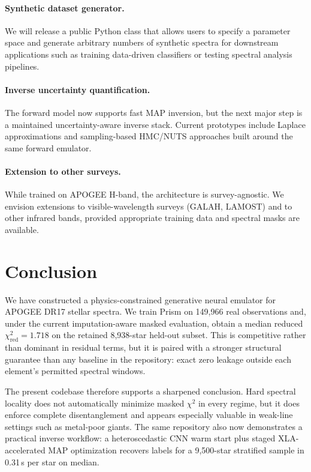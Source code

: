 \documentclass[preprint]{aastex701-1/aastex701}
\begin{document}
\paragraph{Synthetic dataset generator.}
We will release a public Python class that allows users to specify a parameter space and
generate arbitrary numbers of synthetic spectra for downstream applications such as
training data-driven classifiers or testing spectral analysis pipelines.

\paragraph{Inverse uncertainty quantification.}
The forward model now supports fast MAP inversion, but the next major step is a maintained
uncertainty-aware inverse stack. Current prototypes include Laplace approximations and
sampling-based HMC/NUTS approaches built around the same forward emulator.

\paragraph{Extension to other surveys.}
While trained on APOGEE H-band, the architecture is survey-agnostic. We envision
extensions to visible-wavelength surveys (GALAH, LAMOST) and to other infrared bands,
provided appropriate training data and spectral masks are available.

\section{Conclusion}
\label{sec:conclusion}

We have constructed a physics-constrained generative neural emulator for APOGEE DR17
stellar spectra. We train Prism on 149,966 real observations and, under the current
imputation-aware masked evaluation, obtain a median reduced $\chi^2_\mathrm{red}=1.718$
on the retained 8,938-star held-out subset. This is competitive rather than dominant in
residual terms, but it is paired with a stronger structural guarantee than any baseline in
the repository: exact zero leakage outside each element's permitted spectral windows.

The present codebase therefore supports a sharpened conclusion. Hard spectral locality does
not automatically minimize masked $\chi^2$ in every regime, but it does enforce complete
disentanglement and appears especially valuable in weak-line settings such as metal-poor
giants. The same repository also now demonstrates a practical inverse workflow: a
heteroscedastic CNN warm start plus staged XLA-accelerated MAP optimization recovers labels
for a 9,500-star stratified sample in 0.31\,s per star on median.
\end{document}

